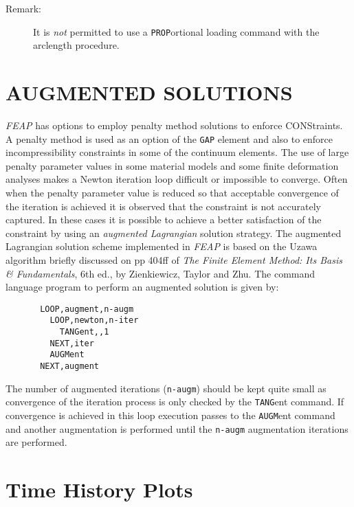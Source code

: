 \begin{description}
\item[Remark:]{It is {\it not} permitted to use a {\tt PROP}ortional loading
command with the arclength procedure.}
\end{description}

\section[Augmented Solutions]{AUGMENTED SOLUTIONS}
\label{augment}

{\sl FEAP} has options to employ penalty method solutions to enforce
CONStraints.  A penalty method is used as an option of the {\tt GAP}
element and also to enforce incompressibility constraints in some of
the continuum elements.  The use of large penalty parameter
values in some material
models and some finite deformation analyses makes a
Newton iteration loop difficult or impossible to converge.  Often
when the penalty parameter value is reduced so that acceptable convergence
of the iteration is achieved it is observed that the constraint is not
accurately captured.  In these cases it is possible to achieve a better
satisfaction of the constraint by using an {\it augmented Lagrangian}
solution strategy.  The augmented Lagrangian solution scheme implemented
in {\sl FEAP} is based on the Uzawa algorithm briefly discussed on pp 404ff
of {\it The Finite Element Method: Its Basis \& Fundamentals}, 6th ed., by
Zienkiewicz, Taylor and Zhu.  The command language program to perform an augmented solution
is given by:
\begin{verbatim}
       LOOP,augment,n-augm
         LOOP,newton,n-iter
           TANGent,,1
         NEXT,iter
         AUGMent
       NEXT,augment
\end{verbatim}
The number of augmented iterations ({\tt n-augm}) should be kept quite
small as convergence of the iteration process is only checked by the
{\tt TANG}ent command.  If convergence is achieved in this loop execution
passes to the {\tt AUGM}ent command and another augmentation is performed
until the {\tt n-augm} augmentation iterations are performed.

\section{Time History Plots}
\label{tplot}

